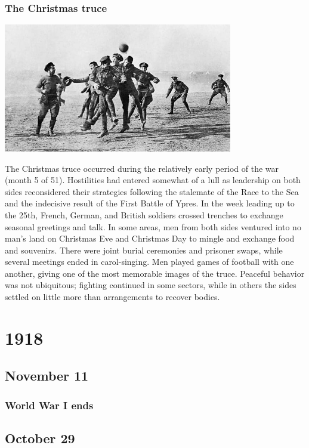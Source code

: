 \documentclass[11pt]{report}
\begin{document}
\subsection{The Christmas truce}
\vspace{2mm}\begin{center}\includegraphics[width=10cm]{./img/christmasTruce.jpg}\end{center}
The Christmas truce occurred during the relatively early period of the war (month 5 of 51). Hostilities had entered somewhat of a lull as leadership on both sides reconsidered their strategies following the stalemate of the Race to the Sea and the indecisive result of the First Battle of Ypres. In the week leading up to the 25th, French, German, and British soldiers crossed trenches to exchange seasonal greetings and talk. In some areas, men from both sides ventured into no man's land on Christmas Eve and Christmas Day to mingle and exchange food and souvenirs. There were joint burial ceremonies and prisoner swaps, while several meetings ended in carol-singing. Men played games of football with one another, giving one of the most memorable images of the truce. Peaceful behavior was not ubiquitous; fighting continued in some sectors, while in others the sides settled on little more than arrangements to recover bodies.

\chapter{1918}
\section{November 11}
\subsection{World War I ends}

\section{October 29}
\end{document}

